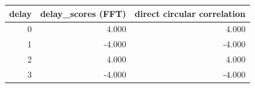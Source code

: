 \begin{tabular}{rrr}
\toprule
delay & delay\_scores (FFT) & direct circular correlation \\
\midrule
0 & 4.000 & 4.000 \\
1 & -4.000 & -4.000 \\
2 & 4.000 & 4.000 \\
3 & -4.000 & -4.000 \\
\bottomrule
\end{tabular}
